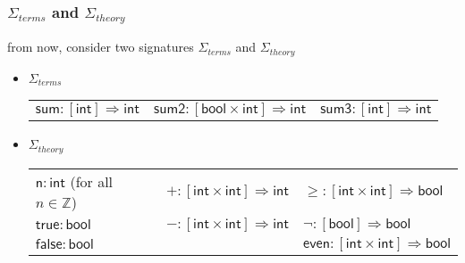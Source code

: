 \documentclass[12pt,aspectratio=169]{beamer}
\newcommand{\m}[1]{\mathsf{#1}}
\newcommand{\mi}[1]{\mathit{#1}}
\newcommand{\Stheory}{\Sigma_\mi{theory}}
\newcommand{\Sterms}{\Sigma_\mi{terms}}
\begin{document}
\begin{frame}
    \frametitle{$\Sterms$ and $\Stheory$}
    from now, consider two signatures $\Sterms$ and $\Stheory$
    \pause
    \begin{example}
        \begin{itemize}
            \item $\Sterms$\\
                \begin{tabular}{lll}
                    $\m{sum} : [\m{int}] \Rightarrow \m{int}$ & $\m{sum2} : [\m{bool} \times \m{int}] \Rightarrow \m{int}$ & $\m{sum3} : [\m{int}] \Rightarrow \m{int}$
                \end{tabular}
            \pause
            \item $\Stheory$\\
                \begin{tabular}{lll}
                    $\m{n} : \m{int}$ (for all $n \in \mathbb{Z}$) & $+ : [\m{int} \times \m{int}] \Rightarrow \m{int}$ & $\geq : [\m{int} \times \m{int}] \Rightarrow \m{bool}$ \\
                    $\m{true} : \m{bool}$ & $- : [\m{int} \times \m{int}] \Rightarrow \m{int}$ & $\neg : [\m{bool}] \Rightarrow \m{bool}$\\
                    $\m{false} : \m{bool}$ & & $\m{even}: [\m{int} \times \m{int}] \Rightarrow \m{bool}$ 
                \end{tabular}
        \end{itemize}
    \end{example}
\end{frame}
\end{document}

